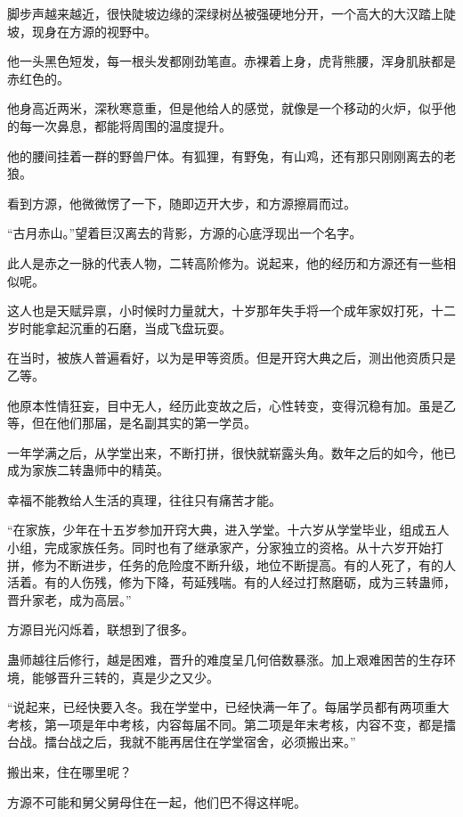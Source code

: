 
\begin{this_body}

脚步声越来越近，很快陡坡边缘的深绿树丛被强硬地分开，一个高大的大汉踏上陡坡，现身在方源的视野中。

他一头黑色短发，每一根头发都刚劲笔直。赤裸着上身，虎背熊腰，浑身肌肤都是赤红色的。

他身高近两米，深秋寒意重，但是他给人的感觉，就像是一个移动的火炉，似乎他的每一次鼻息，都能将周围的温度提升。

他的腰间挂着一群的野兽尸体。有狐狸，有野兔，有山鸡，还有那只刚刚离去的老狼。

看到方源，他微微愣了一下，随即迈开大步，和方源擦肩而过。

“古月赤山。”望着巨汉离去的背影，方源的心底浮现出一个名字。

此人是赤之一脉的代表人物，二转高阶修为。说起来，他的经历和方源还有一些相似呢。

这人也是天赋异禀，小时候时力量就大，十岁那年失手将一个成年家奴打死，十二岁时能拿起沉重的石磨，当成飞盘玩耍。

在当时，被族人普遍看好，以为是甲等资质。但是开窍大典之后，测出他资质只是乙等。

他原本性情狂妄，目中无人，经历此变故之后，心性转变，变得沉稳有加。虽是乙等，但在他们那届，是名副其实的第一学员。

一年学满之后，从学堂出来，不断打拼，很快就崭露头角。数年之后的如今，他已成为家族二转蛊师中的精英。

幸福不能教给人生活的真理，往往只有痛苦才能。

“在家族，少年在十五岁参加开窍大典，进入学堂。十六岁从学堂毕业，组成五人小组，完成家族任务。同时也有了继承家产，分家独立的资格。从十六岁开始打拼，修为不断进步，任务的危险度不断升级，地位不断提高。有的人死了，有的人活着。有的人伤残，修为下降，苟延残喘。有的人经过打熬磨砺，成为三转蛊师，晋升家老，成为高层。”

方源目光闪烁着，联想到了很多。

蛊师越往后修行，越是困难，晋升的难度呈几何倍数暴涨。加上艰难困苦的生存环境，能够晋升三转的，真是少之又少。

“说起来，已经快要入冬。我在学堂中，已经快满一年了。每届学员都有两项重大考核，第一项是年中考核，内容每届不同。第二项是年末考核，内容不变，都是擂台战。擂台战之后，我就不能再居住在学堂宿舍，必须搬出来。”

搬出来，住在哪里呢？

方源不可能和舅父舅母住在一起，他们巴不得这样呢。


\end{this_body}
